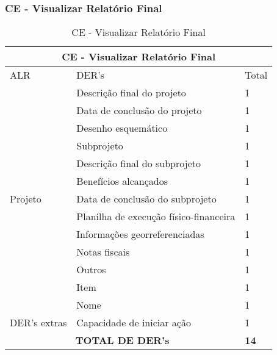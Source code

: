   \subsubsection{CE - Visualizar Relatório Final}
 \begin{table}[!h]
 \centering
  \caption{CE - Visualizar Relatório Final}
\label{ee_visualizar_relatorio_final}
\begin{tabular}{|l|l|l|}
\hline
\multicolumn{3}{|c|}{CE - Visualizar Relatório Final}                                                                 \\ \hline
ALR                           & DER's                                                & Total              \\ \hline
\multirow{13}{*}{Projeto}     & Descrição final do projeto             & 1 \\ \cline{2-3}
                             & Data de conclusão do projeto           & 1 \\ \cline{2-3}
                             & Desenho esquemático                    & 1 \\ \cline{2-3} 
			      & Subprojeto                             & 1 \\ \cline{2-3}
                             & Descrição final do subprojeto          & 1 \\ \cline{2-3}
                             & Benefícios alcançados                  & 1 \\ \cline{2-3}
                             & Data de conclusão do subprojeto        & 1 \\ \cline{2-3}
                             & Planilha de execução físico-financeira & 1 \\ \cline{2-3}
                             & Informações georreferenciadas          & 1 \\ \cline{2-3}
                             & Notas fiscais                          & 1 \\ \cline{2-3}
                             & Outros                                 & 1 \\ \cline{2-3}
                             & Item                                   & 1 \\ \cline{2-3}
                             & Nome                                   & 1 \\ \hline
DER's extras & Capacidade de iniciar ação             & 1 \\ \hline
\multicolumn{2}{|c|}{\textbf{TOTAL DE DER's}}                                                 & \textbf{14}                 \\ \hline
\end{tabular}
\end{table}

